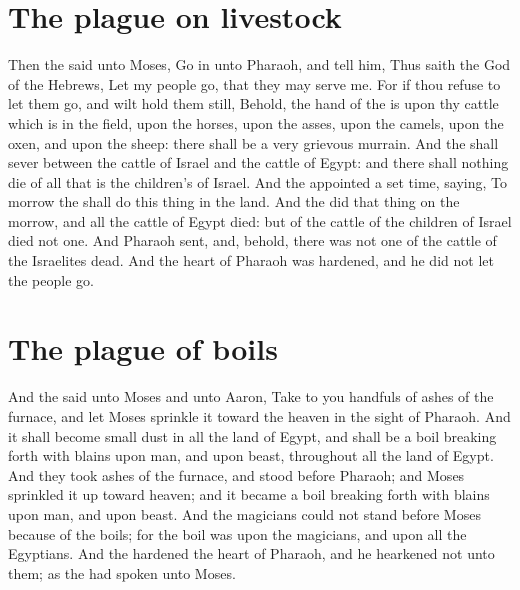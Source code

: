 \section*{The plague on livestock}
\begin{biblechapter} %
\verse Then the \LORD said unto Moses, Go in unto Pharaoh, and tell him, Thus saith the \LORD God of the Hebrews, Let my people go, that they may serve me.
\verse For if thou refuse to let them go, and wilt hold them still,
\verse Behold, the hand of the \LORD is upon thy cattle which is in the field, upon the horses, upon the asses, upon the camels, upon the oxen, and upon the sheep: there shall be a very grievous murrain.
\verse And the \LORD shall sever between the cattle of Israel and the cattle of Egypt: and there shall nothing die of all that is the children's of Israel.
\verse And the \LORD appointed a set time, saying, To morrow the \LORD shall do this thing in the land.
\verse And the \LORD did that thing on the morrow, and all the cattle of Egypt died: but of the cattle of the children of Israel died not one.
\verse And Pharaoh sent, and, behold, there was not one of the cattle of the Israelites dead. And the heart of Pharaoh was hardened, and he did not let the people go.
\section*{The plague of boils}
\verse And the \LORD said unto Moses and unto Aaron, Take to you handfuls of ashes of the furnace, and let Moses sprinkle it toward the heaven in the sight of Pharaoh.
\verse And it shall become small dust in all the land of Egypt, and shall be a boil breaking forth with blains upon man, and upon beast, throughout all the land of Egypt.
\verse And they took ashes of the furnace, and stood before Pharaoh; and Moses sprinkled it up toward heaven; and it became a boil breaking forth with blains upon man, and upon beast.
\verse And the magicians could not stand before Moses because of the boils; for the boil was upon the magicians, and upon all the Egyptians.
\verse And the \LORD hardened the heart of Pharaoh, and he hearkened not unto them; as the \LORD had spoken unto Moses.

\end{biblechapter}

